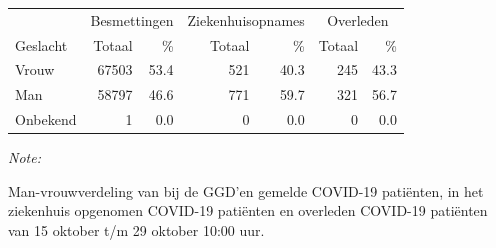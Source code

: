 \documentclass[
  english,
  man,floatsintext]{apa6}
\begin{document}
\begin{table}[H]
\centering\begingroup\fontsize{11}{13}\selectfont

\begin{threeparttable}
\begin{tabular}{lrrrrrr}
\toprule
\multicolumn{1}{c}{ } & \multicolumn{2}{c}{Besmettingen} & \multicolumn{2}{c}{Ziekenhuisopnames} & \multicolumn{2}{c}{Overleden} \\
\cmidrule(l{3pt}r{3pt}){2-3} \cmidrule(l{3pt}r{3pt}){4-5} \cmidrule(l{3pt}r{3pt}){6-7}
Geslacht & Totaal & \% & Totaal & \% & Totaal & \%\\
\midrule
Vrouw & 67503 & 53.4 & 521 & 40.3 & 245 & 43.3\\
Man & 58797 & 46.6 & 771 & 59.7 & 321 & 56.7\\
Onbekend & 1 & 0.0 & 0 & 0.0 & 0 & 0.0\\
\bottomrule
\end{tabular}
\begin{tablenotes}
\item \textit{Note: } 
\item Man-vrouwverdeling van bij de GGD’en gemelde COVID-19 patiënten, in het ziekenhuis opgenomen COVID-19 patiënten en overleden COVID-19 patiënten van 15 oktober t/m 29 oktober 10:00 uur.
\end{tablenotes}
\end{threeparttable}
\endgroup{}
\end{table}
\newpage
\end{document}
